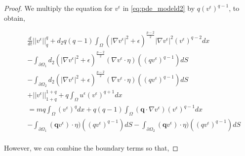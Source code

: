 \documentclass[10pt,a4paper]{amsart}
\begin{document}
\begin{proof}
We multiply the equation for $v^{\epsilon}$ in \eqref{eq:pde_modeld2} by $q(v^{\epsilon})^{q-1}$, to obtain,










\begin{eqnarray}
&& \frac{d}{dt}||v^{\epsilon}||^{q}_{q} + d_{2}  q(q-1)\int_{\Omega} \left(
|\nabla v^{\epsilon}|^{2}+{\epsilon}\right)^{\frac{p-2}{2}}|\nabla v^{\epsilon}|^{2} (v^{\epsilon})^{q-2} dx \nonumber \\
&& -\int_{\partial \Omega_{1}} d_{2}\left(
|\nabla v^{\epsilon}|^{2}+{\epsilon}\right)^{\frac{p-2}{2}}( \nabla v^{\epsilon} \cdot \eta ) ((qv^{\epsilon})^{q-1}) dS \nonumber \\
&& -\int_{\partial \Omega_{2}} d_{2}\left(
|\nabla v^{\epsilon}|^{2}+{\epsilon}\right)^{\frac{p-2}{2}}( \nabla v^{\epsilon} \cdot \eta ) ((qv^{\epsilon})^{q-1}) dS \nonumber \\
&&+||v^{\epsilon}||^{1+q}_{1+q} 
 + q\int_{\Omega}  u^{\epsilon}(v^{\epsilon})^{q+1}dx \nonumber \\
 && =mq\int_{\Omega} (v^{\epsilon})^{q}dx + q(q-1)\int_{\Omega} (\textbf{q}\cdot \nabla v^{\epsilon}) (v^{\epsilon})^{q-1}dx \nonumber \\
 && - \int_{\partial \Omega_{1}} (\textbf{q} v^{\epsilon}) \cdot \eta) ((qv^{\epsilon})^{q-1}) dS 
 - \int_{\partial \Omega_{2}} (\textbf{q} v^{\epsilon}) \cdot \eta) ((qv^{\epsilon})^{q-1}) dS 
 \nonumber \\
\end{eqnarray}

However, we can combine the boundary terms so that,


\end{proof}
\end{document}
